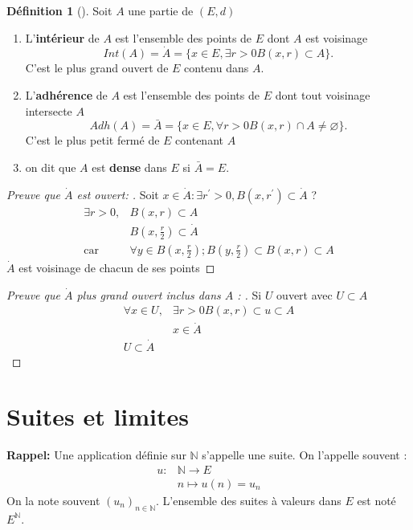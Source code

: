 \documentclass{article}
\theoremstyle{plain}%
\theoremstyle{definition}
\newtheorem{defn}{Définition}[section]
\theoremstyle{remark}
\begin{document}
\begin{defn}[]
    Soit $ A $ une partie de $ (E,d) $ 
    \begin{enumerate}
        \item L'\textbf{intérieur} de $ A $ est l'ensemble des points de $ E $ dont $ A $ est voisinage 
        \[
            Int(A) = \dot{A} = \{x \in E, \exists r > 0 B(x,r) \subset A\} 
        .\]
        C'est le plus grand ouvert de $ E $ contenu dans $ A $.
        \item L'\textbf{adhérence} de $ A $ est l'ensemble des points de $ E $ dont tout voisinage intersecte $ A $ 
        \[
            Adh(A) = \bar{A} = \{x \in E, \forall r > 0 B(x,r) \cap A \neq \varnothing \}
        .\]
        C'est le plus petit fermé de $ E $ contenant $ A $ 
        \item on dit que $ A $ est \textbf{dense} dans $ E $ si $ \bar{A} = E $.
    \end{enumerate}
\end{defn}
\begin{proof}[Preuve que $ \dot{A} $ est ouvert: ]
    Soit $ x \in \dot{A} : \exists r^\prime > 0, B(x, r^\prime) \subset \dot{A} $ ?
    \begin{align*}
        \exists r > 0, & B(x,r) \subset A \\
                        & B(x, \frac{r}{2}) \subset \dot{A} \\
        \text{car }      & \forall y \in B(x, \frac{r}{2}); B(y, \frac{r}{2}) \subset B(x,r) \subset A
    \end{align*} 
    $ \dot{A} $ est voisinage de chacun de ses points 
\end{proof}
\begin{proof}[Preuve que $ \dot{A} $ plus grand ouvert inclus dans $ A $ : ]
    Si $ U $ ouvert avec $ U \subset A $
    \begin{align*}
        \forall x \in U, & \exists r>0 B(x,r) \subset u \subset A \\
                        & x \in \dot{A} \\
            U \subset \dot{A} &
    \end{align*}
\end{proof}


\section{Suites et limites}
\textbf{Rappel:} Une application définie sur $ \mathbb{N} $ s'appelle une suite. On l'appelle souvent :
\begin{align*}
    u: & \mathbb{N} \to E \\
        & n \mapsto u(n) = u_n
\end{align*}
On la note souvent $ (u_n)_{n \in \mathbb{N}} $. L'ensemble des suites à valeurs dans $ E $ est noté $ E^{\mathbb{N}} $.
\end{document}
